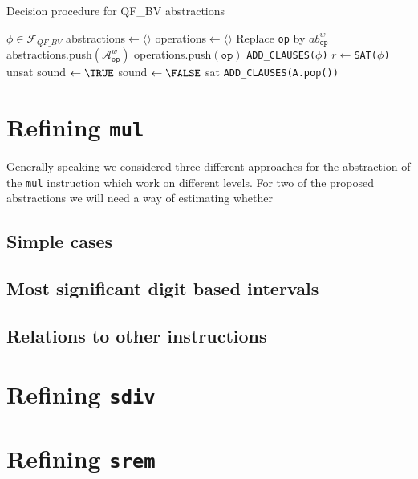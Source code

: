 \begin{algorithm}
    \caption{Decision procedure for QF\_BV abstractions}
    \begin{algorithmic}
    \label{algorithm:refinement_approach:abstraction_scheme:refinement}
    \REQUIRE $\phi \in \mathcal{F}_{QF\_BV}$
    \STATE abstractions$ \leftarrow \langle\rangle$
    \STATE operations$ \leftarrow \langle\rangle$
            \STATE Replace \texttt{op} by $ab_\texttt{op}^w$
            \STATE abstractions.push$\left(\mathcal{A}_\texttt{op}^w\right)$
            \STATE operations.push$\left(\texttt{op}\right)$
        \ENDIF
    \ENDFOR
    \STATE \texttt{ADD\_CLAUSES($\phi$)}
    \LOOP
    \STATE $r \leftarrow $\texttt{SAT($\phi$)}
        \PRINT unsat
    \ELSE
        \STATE sound $\leftarrow \TRUE$
                \STATE sound $\leftarrow \FALSE$
            \ENDIF
        \ENDFOR
            \PRINT sat
        \ELSE
                \STATE \texttt{ADD\_CLAUSES(A.pop())}
            \ENDFOR
        \ENDIF
    \ENDIF
    \ENDLOOP
    \end{algorithmic}
\end{algorithm}

\section{Refining \texttt{mul}}
Generally speaking we considered three different approaches for the abstraction of the \texttt{mul} instruction which work on different levels.
For two of the proposed abstractions we will need a way of estimating whether
\subsection{Simple cases}

\subsection{Most significant digit based intervals}

\subsection{Relations to other instructions}

\section{Refining \texttt{sdiv}}

\section{Refining \texttt{srem}}

